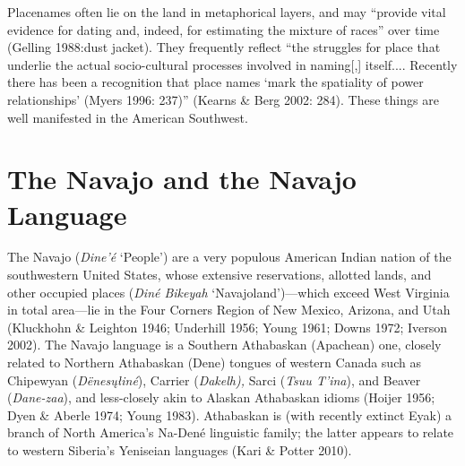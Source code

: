 \clearpage
\noindent
Placenames often lie on the land in metaphorical layers, and may “provide vital evidence for dating and, indeed, for estimating the mixture of races” over time (Gelling 1988:dust jacket).  They frequently reflect “the struggles for place that underlie the actual socio-cultural processes involved in naming[,] itself....  Recently there has been a recognition that place names ‘mark the spatiality of power relationships’ (Myers 1996: 237)” (Kearns \& Berg 2002: 284).  These things are well manifested in the American Southwest.

\section{The Navajo and the Navajo Language}

The Navajo (\textit{Dine’é} ‘People’) are a very populous American Indian nation of the southwestern United States, whose extensive reservations, allotted lands, and other occupied places (\textit{Diné Bikeyah} ‘Navajoland’)—which exceed West Virginia in total area—lie in the Four Corners Region of New Mexico, Arizona, and Utah (Kluckhohn \& Leighton 1946; Underhill 1956; Young 1961; Downs 1972; Iverson 2002).  The Navajo language is a Southern Athabaskan (Apachean) one, closely related to Northern Athabaskan (Dene) tongues of western Canada such as Chipewyan (\textit{Dënes\k{u}łiné}), Carrier (\textit{Dakelh),} Sarci (\textit{Tsuu T'ina}), and Beaver (\textit{Dane-zaa}), and less-closely akin to Alaskan Athabaskan idioms (Hoijer 1956; Dyen \& Aberle 1974; Young 1983).  Athabaskan is (with recently extinct Eyak) a branch of North America’s Na-Dené linguistic family; the latter appears to relate to western Siberia’s Yeniseian languages (Kari \& Potter 2010).

